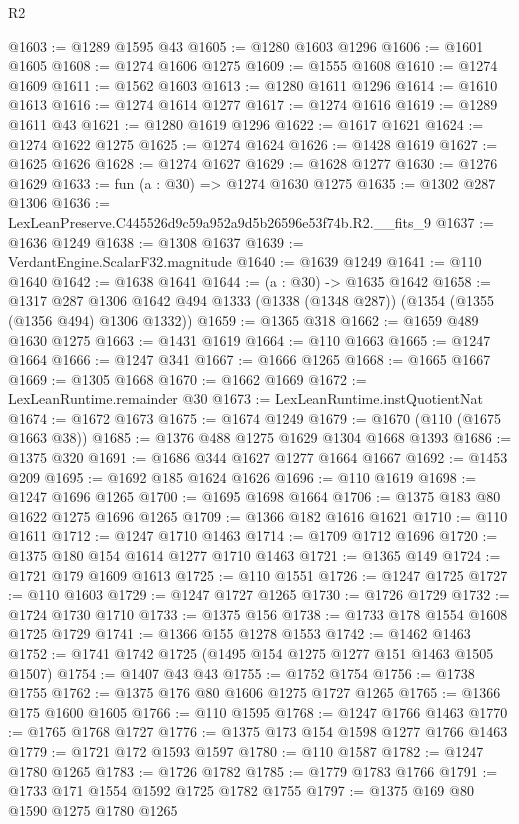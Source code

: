 \begin{lexlean}{R2}
\begin{coremodule}
@1603 := @1289 @1595 @43
@1605 := @1280 @1603 @1296
@1606 := @1601 @1605
@1608 := @1274 @1606 @1275
@1609 := @1555 @1608
@1610 := @1274 @1609
@1611 := @1562 @1603
@1613 := @1280 @1611 @1296
@1614 := @1610 @1613
@1616 := @1274 @1614 @1277
@1617 := @1274 @1616
@1619 := @1289 @1611 @43
@1621 := @1280 @1619 @1296
@1622 := @1617 @1621
@1624 := @1274 @1622 @1275
@1625 := @1274 @1624
@1626 := @1428 @1619
@1627 := @1625 @1626
@1628 := @1274 @1627
@1629 := @1628 @1277
@1630 := @1276 @1629
@1633 := fun (a : @30) => @1274 @1630 @1275
@1635 := @1302 @287 @1306
@1636 := LexLeanPreserve.C445526d9c59a952a9d5b26596e53f74b.R2.__fits_9
@1637 := @1636 @1249
@1638 := @1308 @1637
@1639 := VerdantEngine.ScalarF32.magnitude
@1640 := @1639 @1249
@1641 := @110 @1640
@1642 := @1638 @1641
@1644 := (a : @30) -> @1635 @1642
@1658 := @1317
    @287
    @1306
    @1642
    @494
    @1333
    (@1338 (@1348 @287))
    (@1354 (@1355 (@1356 @494) @1306 @1332))
@1659 := @1365 @318
@1662 := @1659 @489 @1630 @1275
@1663 := @1431 @1619
@1664 := @110 @1663
@1665 := @1247 @1664
@1666 := @1247 @341
@1667 := @1666 @1265
@1668 := @1665 @1667
@1669 := @1305 @1668
@1670 := @1662 @1669
@1672 := LexLeanRuntime.remainder @30
@1673 := LexLeanRuntime.instQuotientNat
@1674 := @1672 @1673
@1675 := @1674 @1249
@1679 := @1670 (@110 (@1675 @1663 @38))
@1685 := @1376 @488 @1275 @1629 @1304 @1668 @1393
@1686 := @1375 @320
@1691 := @1686 @344 @1627 @1277 @1664 @1667
@1692 := @1453 @209
@1695 := @1692 @185 @1624 @1626
@1696 := @110 @1619
@1698 := @1247 @1696 @1265
@1700 := @1695 @1698 @1664
@1706 := @1375 @183 @80 @1622 @1275 @1696 @1265
@1709 := @1366 @182 @1616 @1621
@1710 := @110 @1611
@1712 := @1247 @1710 @1463
@1714 := @1709 @1712 @1696
@1720 := @1375 @180 @154 @1614 @1277 @1710 @1463
@1721 := @1365 @149
@1724 := @1721 @179 @1609 @1613
@1725 := @110 @1551
@1726 := @1247 @1725
@1727 := @110 @1603
@1729 := @1247 @1727 @1265
@1730 := @1726 @1729
@1732 := @1724 @1730 @1710
@1733 := @1375 @156
@1738 := @1733 @178 @1554 @1608 @1725 @1729
@1741 := @1366 @155 @1278 @1553
@1742 := @1462 @1463
@1752 := @1741 @1742 @1725 (@1495 @154 @1275 @1277 @151 @1463 @1505 @1507)
@1754 := @1407 @43 @43
@1755 := @1752 @1754
@1756 := @1738 @1755
@1762 := @1375 @176 @80 @1606 @1275 @1727 @1265
@1765 := @1366 @175 @1600 @1605
@1766 := @110 @1595
@1768 := @1247 @1766 @1463
@1770 := @1765 @1768 @1727
@1776 := @1375 @173 @154 @1598 @1277 @1766 @1463
@1779 := @1721 @172 @1593 @1597
@1780 := @110 @1587
@1782 := @1247 @1780 @1265
@1783 := @1726 @1782
@1785 := @1779 @1783 @1766
@1791 := @1733 @171 @1554 @1592 @1725 @1782 @1755
@1797 := @1375 @169 @80 @1590 @1275 @1780 @1265

\end{coremodule}
\end{lexlean}
